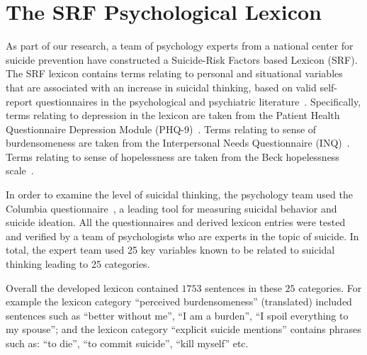 \documentclass[letterpaper]{article} %
\begin{document}
\section{The SRF Psychological Lexicon}
As part of our research, a   team of psychology experts from a national center  for suicide prevention  have constructed a Suicide-Risk Factors based Lexicon (SRF).
The SRF lexicon contains terms relating  to  personal and situational variables that are associated with an increase in suicidal thinking, based on  valid self-report questionnaires in the  psychological and psychiatric literature~\cite{klonsky2015three,turecki2016suicide,nock2008suicide}.
Specifically,  terms relating to depression in the lexicon are taken from the Patient Health Questionnaire Depression Module (PHQ-9)~\cite{kroenke2001phq}.
 Terms relating to sense of burdensomeness are taken from the Interpersonal Needs Questionnaire (INQ)~\cite{van2012thwarted}.
 Terms relating to sense of hopelessness are taken from the Beck hopelessness scale~\cite{beck}.

 In order to examine the level of suicidal thinking, the psychology team used the Columbia questionnaire~\cite{posner2008columbia}, a leading tool for measuring suicidal behavior and suicide ideation. All the questionnaires and derived lexicon entries were tested and verified by a team of psychologists who are experts in the topic of suicide. In total, the expert team used 25 key variables known to be related to suicidal thinking leading to 25 categories.

Overall the developed lexicon contained $1753$ sentences in these $25$ categories. For example the
lexicon category ``perceived burdensomeness” (translated) included sentences such as ``better without me”, ``I am a burden”, ``I spoil everything to my spouse”; and the lexicon category “explicit suicide mentions” contains phrases such as: ``to die'', ``to commit suicide'', ``kill myself'' etc.

\end{document}
